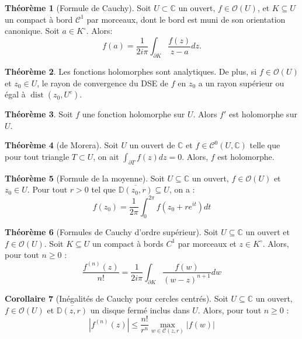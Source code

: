 \documentclass[11pt,a4paper]{article}
\newcommand{\D}{\mathbb{D}}
\newcommand{\C}{\mathbb{C}}
\theoremstyle{definition}
\newtheorem{theoreme}{Th\'eor\`eme}[section]
\newtheorem{corollaire}[theoreme]{Corollaire}
\theoremstyle{plain}
\begin{document}
\begin{theoreme}[Formule de Cauchy]
Soit $U\subset \C$ un ouvert, $f\in \mathcal O(U)$, et $K\subseteq U$ un compact à bord $\mathcal C^1$ par morceaux, dont le bord est muni de son orientation canonique.
Soit $a\in K^{\circ}$.
Alors:
\[ f(a) = \frac{1}{2i\pi}\int_{\partial K} \frac{f(z)}{z-a}dz.\]
\end{theoreme}



\begin{theoreme}
Les fonctions holomorphes sont analytiques.
De plus, si $f\in \mathcal O(U)$ et $z_0 \in U$, le rayon de convergence du DSE de $f$ en $z_0$ a un rayon supérieur ou égal à $\operatorname{dist}(z_0,U^c)$.
\end{theoreme}

\begin{theoreme}
Soit $f$ une fonction holomorphe sur $U$.
Alors $f'$ est holomorphe sur $U$.
\end{theoreme}

\begin{theoreme}[de Morera]
Soit $U$ un ouvert de $\C$ et $f\in \mathcal C^0(U,\C)$ telle que pour tout triangle $T\subset U$, on ait $\int_{\partial T}f(z)dz=0$.
Alors, $f$ est holomorphe.
\end{theoreme}

\begin{theoreme}[Formule de la moyenne]
Soit $U\subseteq \C$ un ouvert,  $f \in \mathcal O(U)$ et $z_0\in U$.
Pour tout $r>0$ tel que $\overline{\D(z_0,r)} \subseteq U$, on a :
\[ f(z_0) = \frac{1}{2\pi}\int_0^{2\pi} f\left(z_0+re^{it}\right)dt\]
\end{theoreme}


\begin{theoreme}[Formules de Cauchy d'ordre supérieur]
Soit $U\subseteq \C$ un ouvert et $f\in \mathcal O(U)$.
Soit $K\subseteq U$ un compact à bords $C^1$ par morceaux et $z\in K^\circ$.
Alors, pour tout $n\geq 0$ :
\[ \frac{f^{(n)}(z)}{n!} = \frac{1}{2i\pi} \int_{\partial K} \frac{f(w)}{(w-z)^{n+1}}dw\]
\end{theoreme}

 
\begin{corollaire}[Inégalités de Cauchy pour cercles centrés]
Soit $U\subseteq \C$ un ouvert,  $f\in \mathcal O(U)$ et $\overline{\mathbb D(z,r)}$ un disque fermé inclus dans $U$.
Alors,  pour tout $n\geq 0$ :
\[ \left|f^{(n)}(z)\right|\leq \frac{n!}{r^n} \max_{w\in \mathcal C(z,r)} |f(w)|\]
\end{corollaire}
\end{document}
